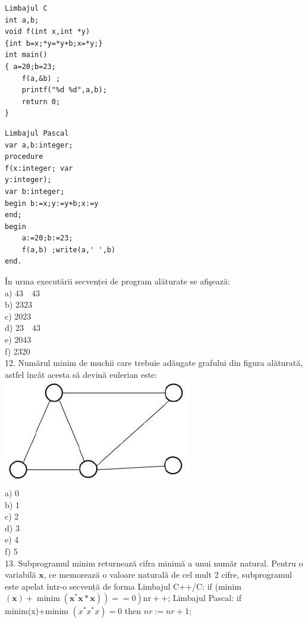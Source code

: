 \documentclass[10pt]{article}
\begin{document}
\begin{verbatim}
Limbajul C
int a,b;
void f(int x,int *y)
{int b=x;*y=*y+b;x=*y;}
int main()
{ a=20;b=23;
    f(a,&b) ;
    printf("%d %d",a,b);
    return 0;
}
\end{verbatim}

\begin{verbatim}
Limbajul Pascal
var a,b:integer;
procedure
f(x:integer; var
y:integer);
var b:integer;
begin b:=x;y:=y+b;x:=y
end;
begin
    a:=20;b:=23;
    f(a,b) ;write(a,' ',b)
end.
\end{verbatim}

În urma executării secvenței de program alăturate se afişează:\\
a) $43 \quad 43$\\
b) 2323\\
c) 2023\\
d) $23 \quad 43$\\
e) 2043\\
f) 2320\\
12. Numărul minim de muchii care trebuie adăugate grafului din figura alăturată, astfel încât acesta să devină eulerian este:\\
\includegraphics[max width=\textwidth, center]{2025_04_17_46e04c6acd873ea9558dg-191}\\
a) 0\\
b) 1\\
c) 2\\
d) 3\\
e) 4\\
f) 5\\
13. Subprogramul minim returnează cifra minimă a unui număr natural. Pentru o variabilă $\mathbf{x}$, ce memorează o valoare naturală de cel mult 2 cifre, subprogramul este apelat într-o secvență de forma Limbajul C++/C: if (minim $\left.\left.(\mathbf{x})+\operatorname{minim}\left(\mathbf{x}^{*} \mathbf{x} * \mathbf{x}\right)\right)==0\right) \mathrm{nr}++$; Limbajul Pascal: if minim(x)+minim $\left(x^{*} x^{*} x\right)=0$ then $n r:=n r+1$;\\
\end{document}
